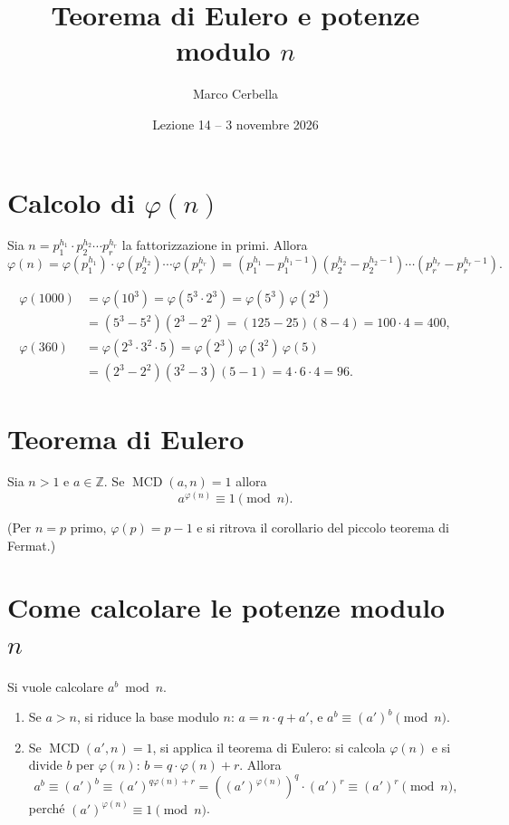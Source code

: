 \documentclass[11pt,a4paper]{article}
\title{Teorema di Eulero e potenze modulo $n$}
\author{Marco Cerbella}
\date{Lezione 14 -- 3 novembre 2026}
\begin{document}
\maketitle

\section{Calcolo di $\varphi(n)$}

\begin{teorema}[Corollario]
Sia $n = p_1^{h_1}\cdot p_2^{h_2}\cdots p_r^{h_r}$ la fattorizzazione in primi. Allora
\[
  \varphi(n) = \varphi(p_1^{h_1})\cdot\varphi(p_2^{h_2})\cdots\varphi(p_r^{h_r}) = \left(p_1^{h_1} - p_1^{h_1 - 1}\right)\left(p_2^{h_2} - p_2^{h_2 - 1}\right)\cdots\left(p_r^{h_r} - p_r^{h_r - 1}\right).
\]
\end{teorema}

\begin{esempio}
\begin{align*}
  \varphi(1000) &= \varphi(10^3) = \varphi(5^3\cdot 2^3) = \varphi(5^3)\,\varphi(2^3)\\
  &= (5^3 - 5^2)(2^3 - 2^2) = (125 - 25)(8 - 4) = 100\cdot 4 = 400,\\
  \varphi(360) &= \varphi(2^3\cdot 3^2\cdot 5) = \varphi(2^3)\,\varphi(3^2)\,\varphi(5)\\
  &= (2^3 - 2^2)(3^2 - 3)(5 - 1) = 4\cdot 6\cdot 4 = 96 .
\end{align*}
\end{esempio}

\section{Teorema di Eulero}

\begin{teorema}[di Eulero]
Sia $n > 1$ e $a \in \mathbb{Z}$. Se $\operatorname{MCD}(a, n) = 1$ allora
\[
  a^{\varphi(n)} \equiv 1 \pmod n .
\]
\end{teorema}

(Per $n = p$ primo, $\varphi(p) = p - 1$ e si ritrova il corollario del piccolo teorema di Fermat.)

\section{Come calcolare le potenze modulo $n$}

Si vuole calcolare $a^b \bmod n$.
\begin{enumerate}
  \item Se $a > n$, si riduce la base modulo $n$: $a = n\cdot q + a'$, e $a^b \equiv (a')^b \pmod n$.
  \item Se $\operatorname{MCD}(a', n) = 1$, si applica il teorema di Eulero: si calcola $\varphi(n)$ e si divide $b$ per $\varphi(n)$: $b = q\cdot\varphi(n) + r$. Allora
  \[
    a^b \equiv (a')^b \equiv (a')^{q\varphi(n) + r} = \left((a')^{\varphi(n)}\right)^q\cdot(a')^r \equiv (a')^r \pmod n,
  \]
  perché $(a')^{\varphi(n)} \equiv 1 \pmod n$.
\end{enumerate}
\end{document}
